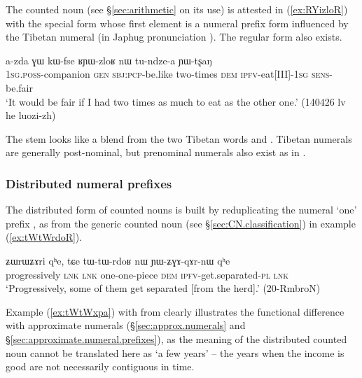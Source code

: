 The counted noun  (see §\ref{sec:arithmetic} on its use) is attested in (\ref{ex:RYizloR}) with the special form  whose first element is a numeral prefix form  influenced by the Tibetan numeral  (in Japhug pronunciation ). The regular form  also exists.
 
\begin{exe}
\ex \label{ex:RYizloR}
\gll a-zda ɣɯ kɯ-fse ʁɲɯ-zloʁ nɯ tu-ndze-a ɲɯ-tʂaŋ \\
 \textsc{1sg}.\textsc{poss}-companion \textsc{gen} \textsc{sbj}:\textsc{pcp}-be.like two-times \textsc{dem} \textsc{ipfv}-eat[III]-\textsc{1sg} \textsc{sens}-be.fair \\
\glt `It would be fair if I had two times as much to eat as the other one.' (140426 lv he luozi-zh)
\end{exe}

The stem  looks like a blend from the two Tibetan words  and . Tibetan numerals are generally post-nominal, but prenominal numerals also exist as in .

\subsubsection{Distributed numeral prefixes} \label{sec:numeral.prefixes.distributed}
The distributed form of counted nouns is built by reduplicating the numeral `one' prefix , as  from the generic counted noun  (see §\ref{sec:CN.classification}) in example (\ref{ex:tWtWrdoR}).

\begin{exe}
\ex  \label{ex:tWtWrdoR}
\gll ʑɯrɯʑɤri qʰe, tɕe tɯ-tɯ-rdoʁ nɯ ɲɯ-ʑɣɤ-qɤr-nɯ qʰe \\
 progressively \textsc{lnk} \textsc{lnk} one-one-piece \textsc{dem} \textsc{ipfv}-get.separated-\textsc{pl} \textsc{lnk} \\
\glt `Progressively, some of them get separated [from the herd].' (20-RmbroN) 
\end{exe}

Example (\ref{ex:tWtWxpa}) with  from  clearly illustrates the functional difference with approximate numerals (§\ref{sec:approx.numerals} and §\ref{sec:approximate.numeral.prefixes}), as the meaning of the distributed counted noun cannot be translated here as `a few years' -- the years when the income is good are not necessarily contiguous in time.

